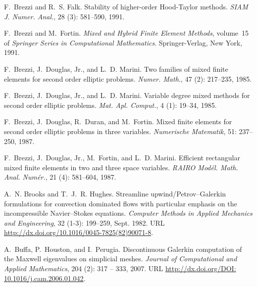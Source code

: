 \begin{thebibliography}{467}
F.~Brezzi and R.~S. Falk.
\newblock Stability of higher-order {H}ood-{T}aylor methods.
\newblock \emph{SIAM J. Numer. Anal.}, 28 (3): 581--590,
  1991.

F.~Brezzi and M.~Fortin.
\newblock \emph{Mixed and Hybrid Finite Element Methods}, volume~15 of
  \emph{Springer Series in Computational Mathematics}.
\newblock Springer-Verlag, New York, 1991.

F.~Brezzi, J.~Douglas, Jr., and L.~D. Marini.
\newblock Two families of mixed finite elements for second order elliptic
  problems.
\newblock \emph{Numer. Math.}, 47 (2): 217--235,
  1985{}.

F.~Brezzi, J.~Douglas, Jr., and L.~D. Marini.
\newblock Variable degree mixed methods for second order elliptic problems.
\newblock \emph{Mat. Apl. Comput.}, 4 (1): 19--34,
  1985{}.

F.~Brezzi, J.~Douglas, R.~Duran, and M.~Fortin.
\newblock Mixed finite elements for second order elliptic problems in three
  variables.
\newblock \emph{Numerische Matematik}, 51: 237--250,
  1987{}.

F.~Brezzi, J.~Douglas, Jr., M.~Fortin, and L.~D. Marini.
\newblock Efficient rectangular mixed finite elements in two and three space
  variables.
\newblock \emph{RAIRO Mod\'el. Math. Anal. Num\'er.}, 21 (4):
  581--604, 1987{}.

A.~N. Brooks and T.~J.~R. Hughes.
\newblock Streamline upwind/{P}etrov--{G}alerkin formulations for convection
  dominated flows with particular emphasis on the incompressible
  {N}avier--{S}tokes equations.
\newblock \emph{Computer Methods in Applied Mechanics and Engineering},
  32 (1-3): 199--259, Sept. 1982.
\newblock URL \url{http://dx.doi.org/10.1016/0045-7825(82)90071-8}.

A.~Buffa, P.~Houston, and I.~Perugia.
\newblock Discontinuous {G}alerkin computation of the {M}axwell eigenvalues on
  simplicial meshes.
\newblock \emph{Journal of Computational and Applied Mathematics}, 204
  (2): 317 -- 333, 2007.
\newblock URL \url{http://dx.doi.org/DOI: 10.1016/j.cam.2006.01.042}.


\end{thebibliography}
